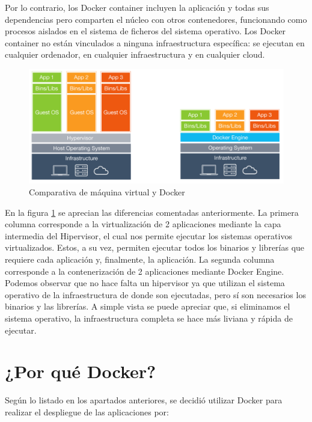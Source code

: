 Por lo contrario, los Docker container incluyen la aplicación y todas sus dependencias pero comparten el núcleo con otros contenedores, funcionando como procesos aislados en el sistema de ficheros del sistema operativo. Los Docker container no están vinculados a ninguna infraestructura específica: se ejecutan en cualquier ordenador, en cualquier infraestructura y en cualquier cloud.

\begin{figure}[htb]
\begin{center}
\includegraphics[width=1\textwidth]{./setup/VrvsDocker}
\caption{Comparativa de máquina virtual y Docker}
\label{Vs:VrvsDocker}
\end{center}
\end{figure}

En la figura \ref{Vs:VrvsDocker} se aprecian las diferencias comentadas anteriormente. La primera columna corresponde a la virtualización de 2 aplicaciones mediante la capa
intermedia del Hipervisor, el cual nos permite ejecutar los sistemas operativos virtualizados. Estos, a su vez, permiten ejecutar todos los binarios y librerías que requiere cada aplicación y, finalmente, la aplicación. La segunda columna corresponde a la contenerización de 2 aplicaciones mediante Docker Engine. Podemos observar
que no hace falta un hipervisor ya que utilizan el sistema operativo de la infraestructura
de donde son ejecutadas, pero sí son necesarios los binarios y las librerías. A simple vista se puede apreciar que, si eliminamos el sistema operativo, la infraestructura completa se hace más liviana y rápida de ejecutar.

\section{¿Por qué Docker?}\label{PqD:PQDocker}

Según lo listado en los apartados anteriores, se decidió utilizar Docker para realizar el despliegue de las aplicaciones por:

